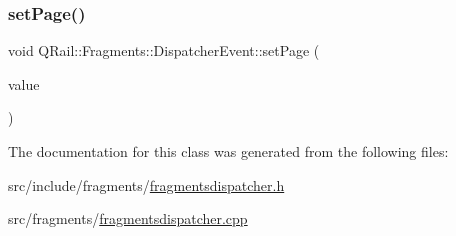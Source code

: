 \mbox{\label{classQRail_1_1Fragments_1_1DispatcherEvent_aa6808a5d6c31f9e9f86337493342f307}} 
\subsubsection{\texorpdfstring{setPage()}{setPage()}}
{\footnotesize\ttfamily void Q\+Rail\+::\+Fragments\+::\+Dispatcher\+Event\+::set\+Page (\begin{DoxyParamCaption}\item[{\mbox{\hyperlink{classQRail_1_1Fragments_1_1Page}{Q\+Rail\+::\+Fragments\+::\+Page}} $\ast$}]{value }\end{DoxyParamCaption})}



The documentation for this class was generated from the following files\+:\begin{DoxyCompactItemize}
\item 
src/include/fragments/\mbox{\hyperlink{fragmentsdispatcher_8h}{fragmentsdispatcher.\+h}}\item 
src/fragments/\mbox{\hyperlink{fragmentsdispatcher_8cpp}{fragmentsdispatcher.\+cpp}}\end{DoxyCompactItemize}

